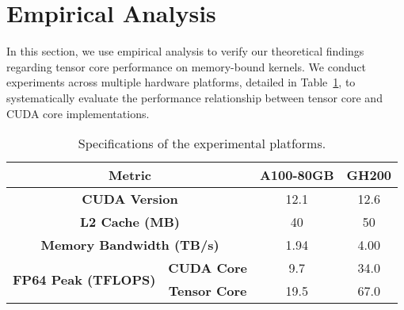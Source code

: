 \section{Empirical Analysis}\label{sec:eval}


In this section, we use empirical analysis to verify our theoretical findings regarding tensor core performance on memory-bound kernels. We conduct experiments across multiple hardware platforms, detailed in Table~\ref{tab:env}, to systematically evaluate the performance relationship between tensor core and CUDA core implementations.


\begin{table}[t]
    \caption{Specifications of the experimental platforms.}
    \label{tab:env}
    \vspace{-14pt}
    \centering
    \footnotesize
    \begin{tabular}{|l|c|c|c|}
    \hline
    \multicolumn{2}{|c|}{\textbf{Metric}}             & \textbf{A100-80GB} & \textbf{GH200} \\\hline
    \multicolumn{2}{|c|}{\textbf{CUDA Version}}             & 12.1 & 12.6\\\hline
    \multicolumn{2}{|c|}{\textbf{L2 Cache (MB)}}        & 40               & 50           \\\hline
    \multicolumn{2}{|c|}{\textbf{Memory Bandwidth (TB/s)}}        & 1.94               & 4.00           \\\hline
    \multirow{2}{*}{\textbf{FP64 Peak (TFLOPS)}} &\textbf{CUDA Core}&  9.7    &  34.0  \\
                                            &\textbf{Tensor Core}& 19.5   &  67.0   \\\hline
    \end{tabular}
    
\end{table}

